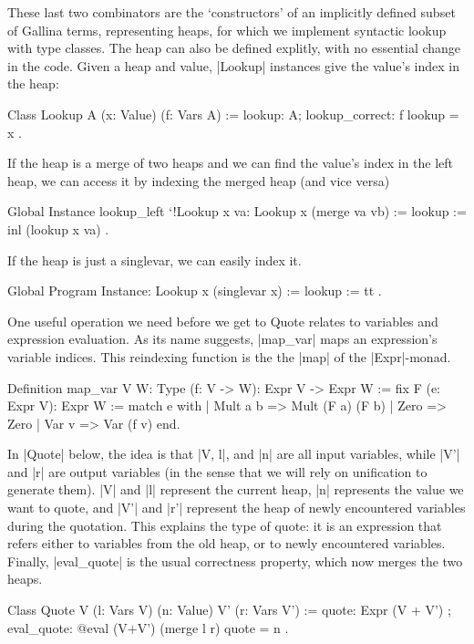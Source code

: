 \documentclass[a4paper,10pt, runningheads]{llncs}
\begin{document}
\noindent These last two combinators are the `constructors' of an implicitly defined subset of
 Gallina terms, representing heaps, for which we implement syntactic lookup with type classes.
The heap can also be defined explitly, with no essential change in the code.
Given a heap and value, |Lookup| instances give the value's index in the heap:
\begin{code}
  Class Lookup {A} (x: Value) (f: Vars A) :=
    { lookup: A; lookup_correct: f lookup = x }.
\end{code}

If the heap is a merge of two heaps and we can find the value's index in the left heap, we can
access it by indexing the merged heap (and vice versa)
\begin{code}
  Global Instance lookup_left `{!Lookup x va}: Lookup x (merge va vb)
    := { lookup := inl (lookup x va) }.
\end{code}
If the heap is just a singlevar, we can easily index it.
\begin{code}
  Global Program Instance: Lookup x (singlevar x) := { lookup := tt }.
\end{code}

One useful operation we need before we get to Quote relates to variables and expression
 evaluation. As its name suggests, |map_var| maps an expression's variable indices.
This reindexing function is the the |map| of the |Expr|-monad.

\begin{code}
Definition map_var {V W: Type} (f: V -> W):
    Expr V -> Expr W :=
  fix F (e: Expr V): Expr W :=
    match e with
    | Mult a b => Mult (F a) (F b)
    | Zero => Zero
    | Var v => Var (f v)
    end.
\end{code}
In |Quote| below, the idea is that |V, l|, and |n| are all input variables, while |V'| and |r| are
output variables (in the sense that we will rely on unification to generate them). |V| and |l|
represent the current heap, |n| represents the value we want to quote, and |V'| and |r'| represent
the heap of newly encountered variables during the quotation.
  This explains the type of quote: it is an expression that refers either to variables from
the old heap, or to newly encountered variables. Finally, |eval_quote| is the usual correctness
property, which now merges the two heaps.

\begin{code}
  Class Quote {V} (l: Vars V) (n: Value) {V'} (r: Vars V') :=
    { quote: Expr (V + V')
    ; eval_quote: @eval (V+V') (merge l r) quote = n }.
\end{code}
\end{document}
